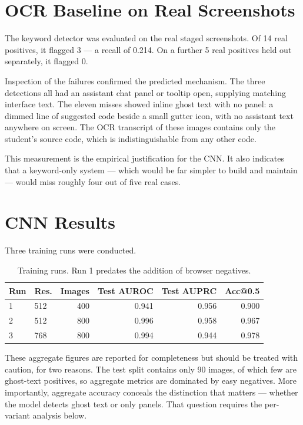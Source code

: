 \documentclass[12pt,oneside]{report}
\begin{document}
\section{OCR Baseline on Real Screenshots}
\label{sec:ocrbaseline}

The keyword detector was evaluated on the real staged screenshots. Of 14 real
positives, it flagged 3 --- a recall of 0.214. On a further 5 real positives
held out separately, it flagged 0.

Inspection of the failures confirmed the predicted mechanism. The three
detections all had an assistant chat panel or tooltip open, supplying matching
interface text. The eleven misses showed inline ghost text with no panel: a
dimmed line of suggested code beside a small gutter icon, with no assistant
text anywhere on screen. The OCR transcript of these images contains only the
student's source code, which is indistinguishable from any other code.

This measurement is the empirical justification for the CNN. It also indicates
that a keyword-only system --- which would be far simpler to build and
maintain --- would miss roughly four out of five real cases.

\section{CNN Results}
\label{sec:cnnresults}

Three training runs were conducted.

\begin{table}[h]
\centering
\caption{Training runs. Run 1 predates the addition of browser negatives.}
\begin{tabular}{@{}llrrrr@{}}
\toprule
\textbf{Run} & \textbf{Res.} & \textbf{Images} & \textbf{Test AUROC} & \textbf{Test AUPRC} & \textbf{Acc@0.5} \\
\midrule
1 & 512 & 400 & 0.941 & 0.956 & 0.900 \\
2 & 512 & 800 & 0.996 & 0.958 & 0.967 \\
3 & 768 & 800 & 0.994 & 0.944 & 0.978 \\
\bottomrule
\end{tabular}
\end{table}

These aggregate figures are reported for completeness but should be treated
with caution, for two reasons. The test split contains only 90 images, of which
few are ghost-text positives, so aggregate metrics are dominated by easy
negatives. More importantly, aggregate accuracy conceals the distinction that
matters --- whether the model detects ghost text or only panels. That question
requires the per-variant analysis below.
\end{document}
